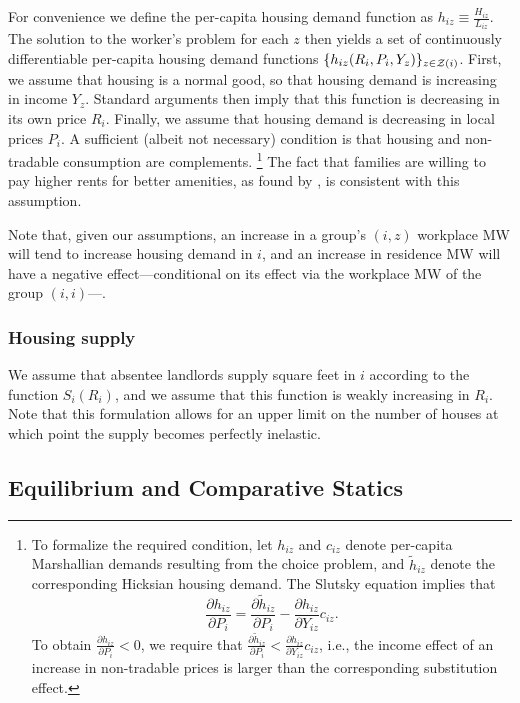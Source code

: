 For convenience we define the per-capita housing demand function as 
$h_{iz} \equiv \frac{H_{iz}}{L_{iz}}$.
The solution to the worker's problem for each $z$ then yields a set of 
continuously differentiable per-capita housing demand functions 
$\{h_{iz} (R_i, P_i, Y_z)\}_{z\in\mathcal{Z}(i)}$.
First, we assume that housing is a normal good, so that housing demand is 
increasing in income $Y_z$.
Standard arguments then imply that this function is decreasing in its own price 
$R_i$.
Finally, we assume that housing demand is decreasing in local prices $P_i$.
A sufficient (albeit not necessary) condition is that housing and non-tradable
consumption are complements.%
\footnote{To formalize the required condition, let $h_{iz}$ and $c_{iz}$ denote 
per-capita Marshallian demands resulting from the choice problem, and 
$\tilde h_{iz}$ denote the corresponding Hicksian housing demand.
The Slutsky equation implies that
$$\frac{\partial h_{iz}}{\partial P_i}
   = \frac{\partial \tilde h_{iz}}{\partial P_i}
   - \frac{\partial h_{iz}}{\partial Y_{iz}} c_{iz}.$$
To obtain $\frac{\partial h_{iz}}{\partial P_i} < 0$, we require that
$\frac{\partial \tilde h_{iz}}{\partial P_i}
< \frac{\partial h_{iz}}{\partial Y_{iz}} c_{iz}$, i.e., the income effect of an
increase in non-tradable prices is larger than the corresponding substitution
effect.}
The fact that families are willing to pay higher rents for better amenities,
as found by \textcite{CoutureEtAl2019}, is consistent with this assumption.

Note that, given our assumptions, 
an increase in a group's $(i,z)$ workplace MW will tend to increase housing 
demand in $i$, 
and an increase in residence MW will have a negative effect---conditional on 
its effect via the workplace MW of the group $(i,i)$---.

\subsubsection*{Housing supply}

We assume that absentee landlords supply square feet in $i$ according to the 
function $S_i(R_i)$,
and we assume that this function is weakly increasing in $R_i$.
Note that this formulation allows for an upper limit on the number of houses at 
which point the supply becomes perfectly inelastic.

\subsection{Equilibrium and Comparative Statics}

